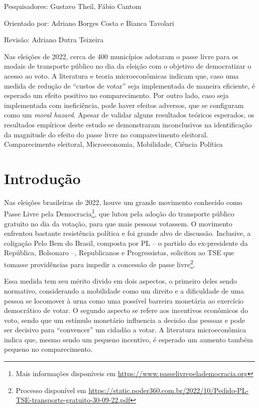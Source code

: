     {
        \noindent Pesquisadores: Gustavo Theil, Fábio Cantom

        \noindent Orientado por: Adriano Borges Costa e Bianca Tavolari

        \noindent Revisão: Adriano Dutra Teixeira
    }
    {
        Nas eleições de 2022, cerca de 400 municípios adotaram o passe livre para os modais de transporte público no dia da eleição com o objetivo de democratizar o acesso ao voto. A literatura e teoria microeconômicas indicam que, caso uma medida de redução de ``custos de votar'' seja implementada de maneira eficiente, é esperado um efeito positivo no comparecimento. Por outro lado, caso seja implementada com ineficiência, pode haver efeitos adversos, que se configuram como um \textit{moral hazard}. Apesar de validar alguns resultados teóricos esperados, os resultados empíricos deste estudo se demonstraram inconclusivos na identificação da magnitude do efeito do passe livre no comparecimento eleitoral. 
    }
    {Comparecimento eleitoral, Microeconomia, Mobilidade, Ciência Política}

\section{Introdução}

Nas eleições brasileiras de 2022, houve um grande movimento conhecido como Passe Livre pela Democracia\footnote{Mais informações disponíveis em \url{https://www.passelivrepelademocracia.org}}, que lutou pela adoção do transporte público gratuito no dia da votação, para que mais pessoas votassem. O movimento enfrentou bastante resistência política e foi grande alvo de discussão. Inclusive, a coligação Pelo Bem do Brasil, composta por PL -- o partido do ex-presidente da República, Bolsonaro --, Republicanos e Progressistas, solicitou ao TSE que tomasse providências para impedir a concessão de passe livre\footnote{Processo disponível em \url{https://static.poder360.com.br/2022/10/Pedido-PL-TSE-transporte-gratuito-30-09-22.pdf}}.



Essa medida tem seu mérito divido em dois aspectos, o primeiro deles sendo normativo, considerando a mobilidade como um direito e a dificuldade de uma pessoa se locomover à urna como uma possível barreira monetária ao exercício democrático de votar. O segundo aspecto se refere aos incentivos econômicos do voto, sendo que um estímulo monetário influencia a decisão das pessoas e pode ser decisivo para ``convencer'' um cidadão a votar. A literatura microeconômica indica que, mesmo sendo um pequeno incentivo, é esperado um aumento também pequeno no comparecimento.

